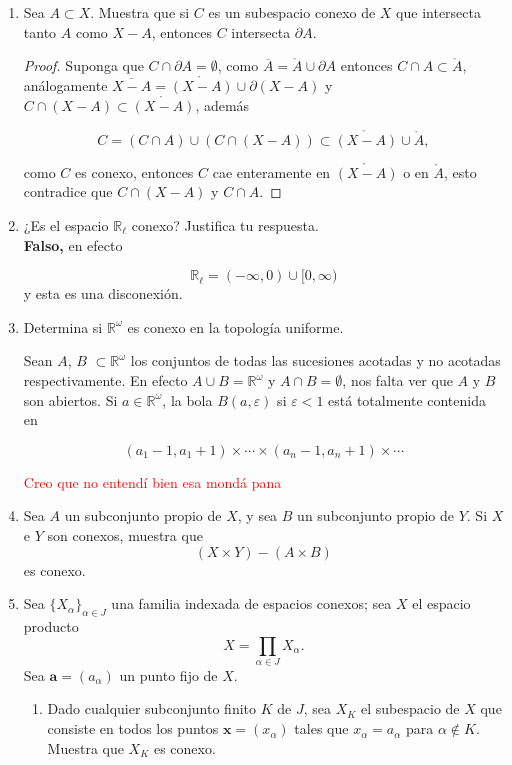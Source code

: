 \documentclass[11pt]{article}
\begin{document}
\begin{enumerate}
    \item Sea $A \subset X$. Muestra que si $C$ es un subespacio conexo de $X$ que intersecta tanto $A$ como $X - A$, entonces $C$ intersecta $\partial A$.

    \begin{proof}
        Suponga que $C\cap \partial A=\emptyset$, como $\overline{A}=\mathring{A}\cup \partial A$ entonces $C\cap A\subset \mathring{A}$, análogamente $\overline{X-A}=\mathring{(X-A)}\cup \partial (X-A)$  y $C\cap (X-A)\subset \mathring{(X-A)}$, además

        $$C=(C\cap A) \cup (C\cap (X-A))\subset \mathring{(X-A)}\cup \mathring{A},$$

        como $C$ es conexo, entonces $C$ cae enteramente en $\mathring{(X-A)}$ o en $\mathring{A}$, esto contradice que $C\cap (X-A)$ y $C\cap A$.
    \end{proof}
    
    \item ¿Es el espacio $\mathbb{R}_\ell$ conexo? Justifica tu respuesta.\\
    
    \textbf{Falso,} en efecto 

    $$\mathbb{R}_{\ell}=(-\infty,0)\cup [0,\infty)$$
     y esta es una disconexión.

    \item Determina si $\mathbb{R}^\omega$ es conexo en la topología uniforme.


Sean $A$, $B$ $\subset\mathbb{R}^\omega$ los conjuntos de todas las sucesiones acotadas y  no acotadas respectivamente. En efecto $A \cup B = \mathbb{R}^\omega$ y $A \cap B = \emptyset$,  nos falta ver que $A$ y $B$ son abiertos. Si $a \in \mathbb{R}^\omega$, la bola $B(a, \varepsilon)$ si $\varepsilon < 1$ está totalmente contenida en

$$
 \left(a_1 - 1, a_1 + 1\right) \times \cdots \times \left(a_n - 1, a_n + 1\right) \times \cdots
$$

\textcolor{red}{Creo que no entendí bien esa mondá pana}

    
    \item Sea $A$ un subconjunto propio de $X$, y sea $B$ un subconjunto propio de $Y$. Si $X$ e $Y$ son conexos, muestra que
    \[
    (X \times Y) - (A \times B)
    \]
    es conexo.

    \item Sea $\{X_\alpha\}_{\alpha \in J}$ una familia indexada de espacios conexos; sea $X$ el espacio producto
    \[
    X = \prod_{\alpha \in J} X_\alpha.
    \]
    Sea $\mathbf{a} = (a_\alpha)$ un punto fijo de $X$.
    \begin{enumerate}
        \item Dado cualquier subconjunto finito $K$ de $J$, sea $X_K$ el subespacio de $X$ que consiste en todos los puntos $\mathbf{x} = (x_\alpha)$ tales que $x_\alpha = a_\alpha$ para $\alpha \notin K$. Muestra que $X_K$ es conexo.
        

\end{enumerate}
\end{enumerate}
\end{document}
